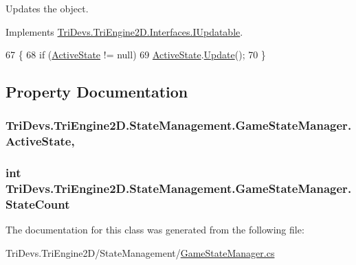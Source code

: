 Updates the object. 



Implements \hyperlink{interface_tri_devs_1_1_tri_engine2_d_1_1_interfaces_1_1_i_updatable_a01e54ce26f078bffd4434aca86e2a7e4}{Tri\-Devs.\-Tri\-Engine2\-D.\-Interfaces.\-I\-Updatable}.


\begin{DoxyCode}
67         \{
68             \textcolor{keywordflow}{if} (\hyperlink{class_tri_devs_1_1_tri_engine2_d_1_1_state_management_1_1_game_state_manager_a31773922546e68ed67483fad253eb747}{ActiveState} != null)
69                 \hyperlink{class_tri_devs_1_1_tri_engine2_d_1_1_state_management_1_1_game_state_manager_a31773922546e68ed67483fad253eb747}{ActiveState}.\hyperlink{interface_tri_devs_1_1_tri_engine2_d_1_1_interfaces_1_1_i_updatable_a01e54ce26f078bffd4434aca86e2a7e4}{Update}();
70         \}
\end{DoxyCode}


\subsection{Property Documentation}
\hypertarget{class_tri_devs_1_1_tri_engine2_d_1_1_state_management_1_1_game_state_manager_a31773922546e68ed67483fad253eb747}{
\subsubsection[{Active\-State}]{ Tri\-Devs.\-Tri\-Engine2\-D.\-State\-Management.\-Game\-State\-Manager.\-Active\-State\hspace{0.3cm}{\ttfamily [get]}, {\ttfamily [set]}}}\label{class_tri_devs_1_1_tri_engine2_d_1_1_state_management_1_1_game_state_manager_a31773922546e68ed67483fad253eb747}
\hypertarget{class_tri_devs_1_1_tri_engine2_d_1_1_state_management_1_1_game_state_manager_a462438e821cbc175cf04d517c1fbdada}{
\subsubsection[{State\-Count}]{\setlength{\rightskip}{0pt plus 5cm}int Tri\-Devs.\-Tri\-Engine2\-D.\-State\-Management.\-Game\-State\-Manager.\-State\-Count\hspace{0.3cm}{\ttfamily [get]}}}\label{class_tri_devs_1_1_tri_engine2_d_1_1_state_management_1_1_game_state_manager_a462438e821cbc175cf04d517c1fbdada}


The documentation for this class was generated from the following file\-:\begin{DoxyCompactItemize}
\item 
Tri\-Devs.\-Tri\-Engine2\-D/\-State\-Management/\hyperlink{_game_state_manager_8cs}{Game\-State\-Manager.\-cs}\end{DoxyCompactItemize}
